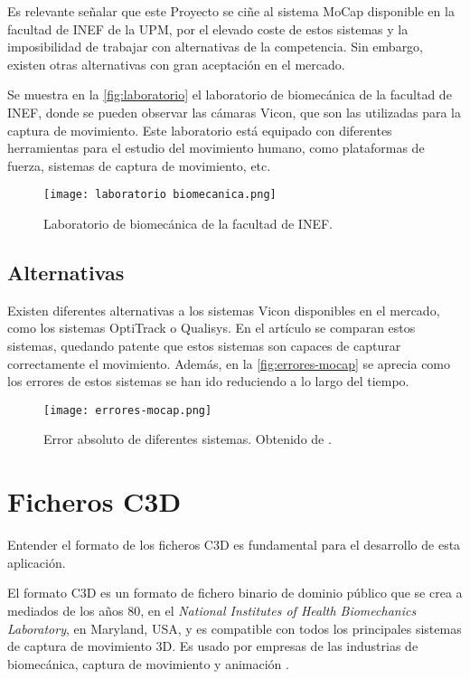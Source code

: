 Es relevante señalar que este Proyecto se ciñe al sistema \ac{MoCap} disponible en la facultad de INEF de la \ac{UPM}, por el elevado coste de estos sistemas y la imposibilidad de trabajar con alternativas de la competencia. Sin embargo, existen otras alternativas con gran aceptación en el mercado. 

Se muestra en la \autoref{fig:laboratorio} el laboratorio de biomecánica de la facultad de \ac{INEF}, donde se pueden observar las cámaras Vicon, que son las utilizadas para la captura de movimiento. Este laboratorio está equipado con diferentes herramientas para el estudio del movimiento humano, como plataformas de fuerza, sistemas de captura de movimiento, etc.

\begin{figure}[H]
    \centering
    \texttt{[image: laboratorio biomecanica.png]}
    \caption{Laboratorio de biomecánica de la facultad de \ac{INEF}.}
    \label{fig:laboratorio}
\end{figure}

\subsection{Alternativas}
Existen diferentes alternativas a los sistemas Vicon disponibles en el mercado, como los sistemas OptiTrack o Qualisys. En el artículo \autocite{article} se comparan estos sistemas, quedando patente que estos sistemas son capaces de capturar correctamente el movimiento. Además, en la \autoref{fig:errores-mocap} se aprecia como los errores de estos sistemas se han ido reduciendo a lo largo del tiempo.

\begin{figure}[H]
    \centering
    \texttt{[image: errores-mocap.png]}
    \caption{Error absoluto de diferentes sistemas. Obtenido de \autocite{article}.}
    \label{fig:errores-mocap}
\end{figure}

\section{Ficheros \acs{C3D}} \label{sec:ficheros-c3d}
Entender el formato de los ficheros \ac{C3D} es fundamental para el desarrollo de esta aplicación. 

El formato \ac{C3D} es un formato de fichero binario de dominio público que se crea a mediados de los años 80, en el \textit{National Institutes of Health Biomechanics Laboratory}, en Maryland, USA, y es compatible con todos los principales sistemas de captura de movimiento 3D. Es usado por empresas de las industrias de biomecánica, captura de movimiento y animación \autocite{C3DORGBiomechanicsStandard}.

